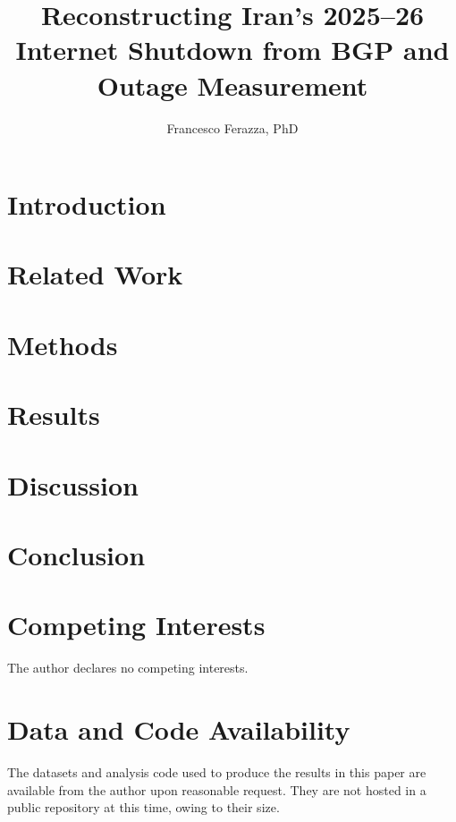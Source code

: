 \documentclass[11pt]{article}
\title{Reconstructing Iran's 2025--26 Internet Shutdown from BGP and Outage Measurement}
\author{Francesco Ferazza, PhD}
\date{}
\begin{document}
\maketitle



\section{Introduction}


\section{Related Work}
\label{sec:related}


\section{Methods}
\label{sec:methods}


\section{Results}
\label{sec:results}


\section{Discussion}
\label{sec:discussion}


\section{Conclusion}
\label{sec:conclusion}


\section*{Competing Interests}
The author declares no competing interests.

\section*{Data and Code Availability}
The datasets and analysis code used to produce the results in this paper
are available from the author upon reasonable request. They are not
hosted in a public repository at this time, owing to their size.




\listoftodos
\end{document}
